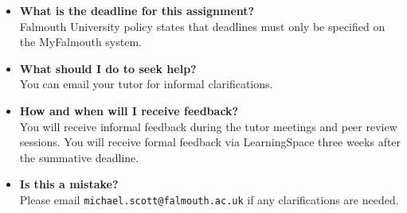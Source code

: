 \documentclass{../../fal_assignment}
\begin{document}
\begin{itemize}
	\item 	\textbf{What is the deadline for this assignment?} \\ 
    		Falmouth University policy states that deadlines must only be specified on the MyFalmouth system.
    		
            \item 	\textbf{What should I do to seek help?} \\ 
    		You can email your tutor for informal clarifications.
    		
            \item 	\textbf{How and when will I receive feedback?} \\ 
            You will receive informal feedback during the tutor meetings and peer review sessions.
            You will receive formal feedback via LearningSpace three weeks after the summative deadline.
    		
    	\item 	\textbf{Is this a mistake?} \\ 	
    		Please email \texttt{michael.scott@falmouth.ac.uk} if any clarifications are needed.
\end{itemize}


%
\end{document}
